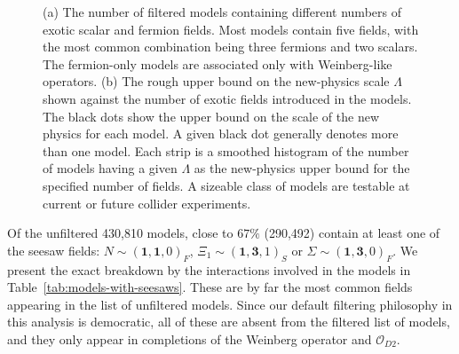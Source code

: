 \begin{figure}
  \centering
  \caption[(a) The number of filtered models containing different numbers of
  exotic scalar and fermion fields. (b) The rough upper bound on the new-physics
  scale $\Lambda$ shown against the number of exotic fields introduced in the
  models.]{(a) The number of filtered models containing different numbers of
    exotic scalar and fermion fields. Most models contain five fields, with the
    most common combination being three fermions and two scalars. The
    fermion-only models are associated only with Weinberg-like operators. (b)
    The rough upper bound on the new-physics scale $\Lambda$ shown against the
    number of exotic fields introduced in the models. The black dots show the
    upper bound on the scale of the new physics for each model. A given black
    dot generally denotes more than one model. Each strip is a smoothed
    histogram of the number of models having a given $\Lambda$ as the
    new-physics upper bound for the specified number of fields. A sizeable class
    of models are testable at current or future collider experiments.}
  \label{fig:number-of-fields}
\end{figure}

Of the unfiltered 430,810 models, close to $67\%$ (290,492) contain at least one
of the seesaw fields: $N \sim (\mathbf{1}, \mathbf{1}, 0)_{F}$,
$\Xi_{1} \sim (\mathbf{1}, \mathbf{3}, 1)_{S}$ or
$\Sigma \sim (\mathbf{1}, \mathbf{3}, 0)_{F}$. We present the exact breakdown by
the interactions involved in the models in Table~\ref{tab:models-with-seesaws}.
These are by far the most common fields appearing in the list of unfiltered
models. Since our default filtering philosophy in this analysis is democratic,
all of these are absent from the filtered list of models, and they only appear
in completions of the Weinberg operator and $\mathcal{O}_{D2}$.

